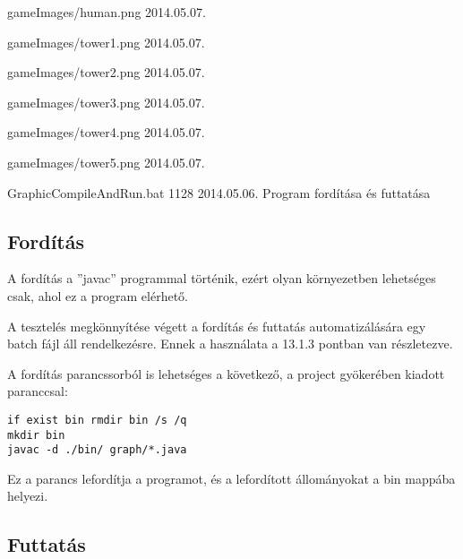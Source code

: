 \begin{fajllista}
\fajl
{gameImages/human.png}
{}
{2014.05.07.}
{}

\fajl
{gameImages/tower1.png}
{}
{2014.05.07.}
{}

\fajl
{gameImages/tower2.png}
{}
{2014.05.07.}
{}

\fajl
{gameImages/tower3.png}
{}
{2014.05.07.}
{}

\fajl
{gameImages/tower4.png}
{}
{2014.05.07.}
{}

\fajl
{gameImages/tower5.png}
{}
{2014.05.07.}
{}










\fajl
{GraphicCompileAndRun.bat}
{1128}
{2014.05.06.}
{Program fordítása és futtatása}


\end{fajllista}

\lstset{escapeinside=`', xleftmargin=10pt, frame=single, basicstyle=\ttfamily\footnotesize, language=sh}

\subsection{Fordítás}


A fordítás a ''javac'' programmal történik, ezért olyan környezetben lehetséges csak, ahol ez a program elérhető. 

A tesztelés megkönnyítése végett a fordítás és futtatás automatizálására egy batch fájl áll rendelkezésre. Ennek a használata a 13.1.3 pontban van részletezve. 

A fordítás parancssorból is lehetséges a következő, a project gyökerében kiadott paranccsal:

\begin{lstlisting}
if exist bin rmdir bin /s /q
mkdir bin
javac -d ./bin/ graph/*.java
\end{lstlisting}

Ez a parancs lefordítja a programot, és a lefordított állományokat a bin mappába helyezi.  



\subsection{Futtatás}

